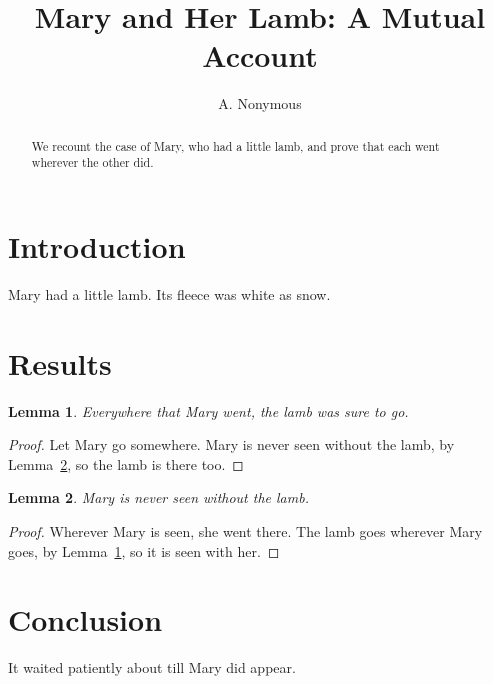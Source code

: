 \documentclass{article}
\title{Mary and Her Lamb: A Mutual Account}
\author{A. Nonymous}
\newtheorem{lemma}{Lemma}
\begin{document}
\maketitle
\begin{abstract}
We recount the case of Mary, who had a little lamb, and prove that each went
wherever the other did.
\end{abstract}

\section{Introduction}
Mary had a little lamb. Its fleece was white as snow.

\section{Results}
\begin{lemma}\label{lem:follows}
Everywhere that Mary went, the lamb was sure to go.
\end{lemma}
\begin{proof}
Let Mary go somewhere. Mary is never seen without the lamb, by
Lemma~\ref{lem:accompanied}, so the lamb is there too.
\end{proof}

\begin{lemma}\label{lem:accompanied}
Mary is never seen without the lamb.
\end{lemma}
\begin{proof}
Wherever Mary is seen, she went there. The lamb goes wherever Mary goes, by
Lemma~\ref{lem:follows}, so it is seen with her.
\end{proof}

\section{Conclusion}
It waited patiently about till Mary did appear.
\end{document}
